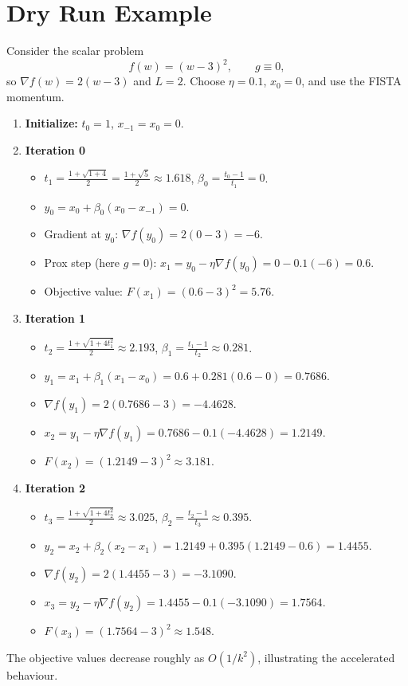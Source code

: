 \documentclass{article}
\begin{document}
\section*{Dry Run Example}
Consider the scalar problem
\[
f(w) = (w-3)^2,\qquad g\equiv 0,
\]
so $\nabla f(w)=2(w-3)$ and $L=2$.  
Choose $\eta=0.1$, $x_0=0$, and use the FISTA momentum.

\begin{enumerate}[label=Iteration \arabic*: , leftmargin=*]
\item \textbf{Initialize:} $t_0=1$, $x_{-1}=x_0=0$.
\item \textbf{Iteration 0}
    \begin{itemize}
        \item $t_{1}= \frac{1+\sqrt{1+4}}{2}= \frac{1+\sqrt5}{2}\approx1.618$,
        $\beta_0=\frac{t_0-1}{t_1}=0$.
        \item $y_0 = x_0 + \beta_0 (x_0-x_{-1}) =0$.
        \item Gradient at $y_0$: $\nabla f(y_0)=2(0-3)=-6$.
        \item Prox step (here $g=0$): $x_{1}=y_0-\eta\nabla f(y_0)=0-0.1(-6)=0.6$.
        \item Objective value: $F(x_1)= (0.6-3)^2 =5.76$.
    \end{itemize}
\item \textbf{Iteration 1}
    \begin{itemize}
        \item $t_{2}= \frac{1+\sqrt{1+4t_1^{2}}}{2}\approx 2.193$,
        $\beta_1=\frac{t_1-1}{t_2}\approx0.281$.
        \item $y_1 = x_1 + \beta_1 (x_1-x_0)=0.6+0.281(0.6-0)=0.7686$.
        \item $\nabla f(y_1)=2(0.7686-3)=-4.4628$.
        \item $x_{2}= y_1-\eta\nabla f(y_1)=0.7686-0.1(-4.4628)=1.2149$.
        \item $F(x_2)=(1.2149-3)^2\approx3.181$.
    \end{itemize}
\item \textbf{Iteration 2}
    \begin{itemize}
        \item $t_{3}= \frac{1+\sqrt{1+4t_2^{2}}}{2}\approx 3.025$,
        $\beta_2=\frac{t_2-1}{t_3}\approx0.395$.
        \item $y_2 = x_2 + \beta_2 (x_2-x_1)=1.2149+0.395(1.2149-0.6)=1.4455$.
        \item $\nabla f(y_2)=2(1.4455-3)=-3.1090$.
        \item $x_{3}= y_2-\eta\nabla f(y_2)=1.4455-0.1(-3.1090)=1.7564$.
        \item $F(x_3)=(1.7564-3)^2\approx1.548$.
    \end{itemize}
\end{enumerate}
The objective values decrease roughly as $O(1/k^{2})$, illustrating the accelerated behaviour.
\end{document}
